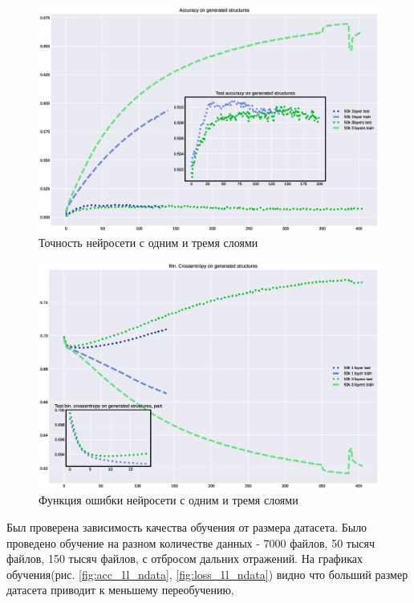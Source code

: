 \documentclass{article}
\begin{document}
\begin{figure}[!htp]
\includegraphics[width=\linewidth]{imgs/acc-50k.eps}
  \caption{Точность нейросети с одним и тремя слоями}\label{fig:acc_50k}
\end{figure}

\begin{figure}[!htp]
\includegraphics[width=\linewidth]{imgs/loss-50k.eps}
  \caption{Функция ошибки нейросети с одним и тремя слоями}\label{fig:loss_50k}
\end{figure}

Был проверена зависимость качества обучения от размера датасета. Было проведено обучение на разном количестве данных - 7000 файлов, 50 тысяч файлов, 150 тысяч файлов, с отбросом дальних отражений. На графиках обучения(рис. \ref{fig:acc_1l_ndata}, \ref{fig:loss_1l_ndata}) видно что больший размер датасета приводит к меньшему переобучению, %
\end{document}
